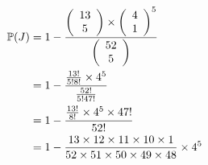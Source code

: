 \begin{align*}
    \mathbb{P}(J) &= 1 - \frac{{\left( \begin{array}{cc}13 \\ 5\end{array} \right)} \times {{\left( \begin{array}{cc}4 \\ 1\end{array} \right)}}^5}{{\left( \begin{array}{cc}52 \\ 5\end{array} \right)}} \\
    &= 1 - \frac{\frac{13!}{5!8!} \times 4^5}{\frac{52!}{5!47!}} \\
    &= 1 - \frac{\frac{13!}{8!} \times 4^5 \times 47!}{52!}\\
    &= 1 - \frac{13 \times 12 \times 11 \times 10 \times 1}{52 \times 51 \times 50 \times 49 \times 48} \times 4^5
\end{align*}

